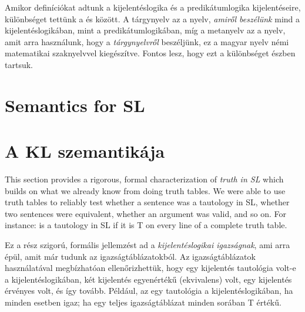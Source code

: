 Amikor definíciókat adtunk a kijelentéslogika és a predikátumlogika kijelentéseire, különbséget tettünk a  és  között. A tárgynyelv az a nyelv, \emph{amiről beszélünk} mind a kijelentéslogikában, mint a predikátumlogikában, míg a metanyelv az a nyelv, amit arra használunk, hogy a \emph{tárgynyelvről} beszéljünk, ez a magyar nyelv némi matematikai szaknyelvvel kiegészítve. Fontos lesz, hogy ezt a különbséget észben tartsuk.




\section*{Semantics for SL}
\section{A KL szemantikája}

This section provides a rigorous, formal characterization of \emph{truth in SL} which builds on what we already know from doing truth tables. We were able to use truth tables to reliably test whether a sentence was a tautology in SL, whether two sentences were equivalent, whether an argument was valid, and so on. For instance:  is a tautology in SL if it is T on every line of a complete truth table.

Ez a rész szigorú, formális jellemzést ad a \emph{kijelentéslogikai igazságnak}, ami arra épül, amit már tudunk az igazságtáblázatokból. Az igazságtáblázatok használatával megbízhatóan ellenőrizhettük, hogy egy kijelentés tautológia volt-e a kijelentéslogikában, két kijelentés egyenértékű (ekvivalens) volt, egy kijelentés érvényes volt, és így tovább. Például, az  egy tautológia a kijelentéslogikában, ha minden esetben igaz; ha egy teljes igazságtáblázat minden sorában T értékű.


